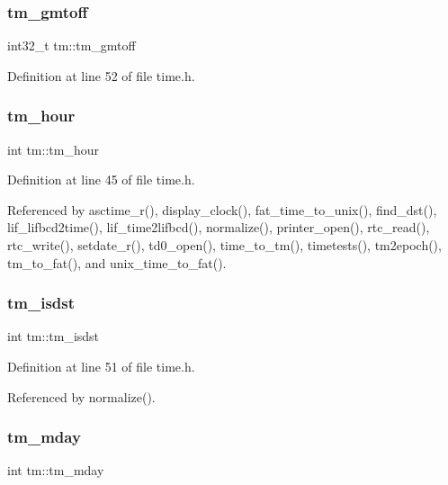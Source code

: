 \subsubsection{\texorpdfstring{tm\+\_\+gmtoff}{tm\_gmtoff}}
{\footnotesize\ttfamily int32\+\_\+t tm\+::tm\+\_\+gmtoff}



Definition at line 52 of file time.\+h.

\mbox{\label{structtm_a3e7ca4e37f1abcaf56b8a916c38eb9fe}} 
\subsubsection{\texorpdfstring{tm\+\_\+hour}{tm\_hour}}
{\footnotesize\ttfamily int tm\+::tm\+\_\+hour}



Definition at line 45 of file time.\+h.



Referenced by asctime\+\_\+r(), display\+\_\+clock(), fat\+\_\+time\+\_\+to\+\_\+unix(), find\+\_\+dst(), lif\+\_\+lifbcd2time(), lif\+\_\+time2lifbcd(), normalize(), printer\+\_\+open(), rtc\+\_\+read(), rtc\+\_\+write(), setdate\+\_\+r(), td0\+\_\+open(), time\+\_\+to\+\_\+tm(), timetests(), tm2epoch(), tm\+\_\+to\+\_\+fat(), and unix\+\_\+time\+\_\+to\+\_\+fat().

\mbox{\label{structtm_a5645ca0580c8ab2c24f6c2965d9c9f9c}} 
\subsubsection{\texorpdfstring{tm\+\_\+isdst}{tm\_isdst}}
{\footnotesize\ttfamily int tm\+::tm\+\_\+isdst}



Definition at line 51 of file time.\+h.



Referenced by normalize().

\mbox{\label{structtm_ab8d8904bad43b0c8b96e61941c5b5310}} 
\subsubsection{\texorpdfstring{tm\+\_\+mday}{tm\_mday}}
{\footnotesize\ttfamily int tm\+::tm\+\_\+mday}



